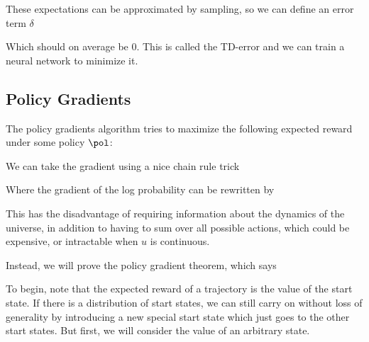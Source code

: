 \documentclass[12pt]{article}
\begin{document}

These expectations can be approximated by sampling, so we can define an error term $\delta$


Which should on average be 0. This is called the TD-error and we can train a neural network to minimize it.

\subsection{Policy Gradients}

The policy gradients algorithm tries to maximize the following expected reward under some policy $\pol$:


We can take the gradient using a nice chain rule trick


Where the gradient of the log probability can be rewritten by

This has the disadvantage of requiring information about the dynamics of the universe, in addition to having to sum over all possible actions, which could be expensive, or intractable when $u$ is continuous.

Instead, we will prove the policy gradient theorem, which says


To begin, note that the expected reward of a trajectory is the value of the start state. If there is a distribution of start states, we can still carry on without loss of generality by introducing a new special start state which just goes to the other start states. But first, we will consider the value of an arbitrary state.
\end{document}
